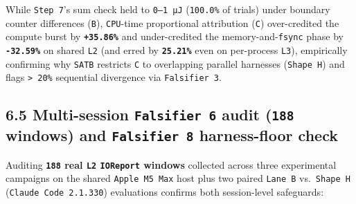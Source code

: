 \documentclass[10pt,letterpaper]{article}
\begin{document}
While \texttt{Step\ 7}'s sum check held to \texttt{0–1\ µJ}
(\texttt{100.0\%} of trials) under boundary counter differences
(\texttt{B}), \texttt{CPU}-time proportional attribution (\texttt{C})
over-credited the compute burst by \textbf{\texttt{+35.86\%}} and
under-credited the memory-and-\texttt{fsync} phase by
\textbf{\texttt{-32.59\%}} on shared \texttt{L2} (and erred by
\textbf{\texttt{25.21\%}} even on per-process \texttt{L3}), empirically
confirming why \texttt{SATB} restricts \texttt{C} to overlapping
parallel harnesses (\texttt{Shape\ H}) and flags
\texttt{\textgreater{}\ 20\%} sequential divergence via
\texttt{Falsifier\ 3}.

\subsection{\texorpdfstring{6.5 Multi-session \texttt{Falsifier\ 6}
audit (\texttt{188} windows) and \texttt{Falsifier\ 8} harness-floor
check}{6.5 Multi-session Falsifier 6 audit (188 windows) and Falsifier 8 harness-floor check}}\label{multi-session-falsifier-6-audit-188-windows-and-falsifier-8-harness-floor-check}

Auditing \textbf{\texttt{188} real \texttt{L2} \texttt{IOReport}
windows} collected across three experimental campaigns on the shared
\texttt{Apple\ M5\ Max} host plus two paired \texttt{Lane\ B}
vs.~\texttt{Shape\ H} (\texttt{Claude\ Code\ 2.\allowbreak{}1.\allowbreak{}330}) evaluations
confirms both session-level safeguards:
\end{document}
